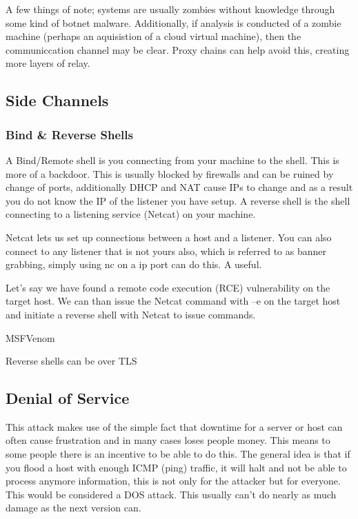 A few things of note; systems are usually zombies without knowledge through some kind of botnet malware. Additionally, if analysis is conducted of a zombie machine (perhaps an aquisistion of a cloud virtual machine), then the communiccation channel may be clear. Proxy chains can help avoid this, creating more layers of relay.

\subsection{Side Channels}
\subsubsection{Bind & Reverse Shells}
A Bind/Remote shell is you connecting from your machine to the shell. This is more of a backdoor. This is usually blocked by firewalls and can be ruined by change of ports, additionally DHCP and NAT cause IPs to change and as a result you do not know the IP of the listener you have setup.
A reverse shell is the shell connecting to a listening service (Netcat) on your machine.

Netcat lets us set up connections between a host and a listener. You can also connect to any listener that is not yours also, which is referred to as banner grabbing, simply using nc on a ip port can do this. 
A useful. 

Let’s say we have found a remote code execution (RCE) vulnerability on the target host. We can than issue the Netcat command with –e on the target host and initiate a reverse shell with Netcat to issue commands.

MSFVenom

Reverse shells can be over TLS



\subsection{Denial of Service}
This attack makes use of the simple fact that downtime for a server or host can often cause frustration and in many cases loses people money. This means to some people there is an incentive to be able to do this. The general idea is that if you flood a host with enough ICMP (ping) traffic, it will halt and not be able to process anymore information, this is not only for the attacker but for everyone. This would be considered a DOS attack. 
This usually can't do nearly as much damage as the next version can. 

